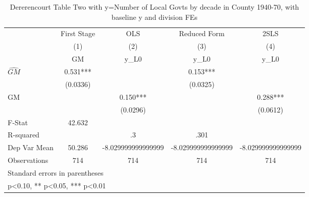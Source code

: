 \begin{table}[htbp]\centering
\def\sym#1{\ifmmode^{#1}\else\(^{#1}\)\fi}
\caption{Dererencourt Table Two with y=Number of Local Govts by decade in County 1940-70, with baseline y and division FEs}
\begin{tabular}{l*{4}{c}}
\toprule
                    & First Stage   &         OLS   &Reduced Form   &        2SLS   \\
                    &\multicolumn{1}{c}{(1)}&\multicolumn{1}{c}{(2)}&\multicolumn{1}{c}{(3)}&\multicolumn{1}{c}{(4)}\\
                    &\multicolumn{1}{c}{GM}&\multicolumn{1}{c}{y\_L0}&\multicolumn{1}{c}{y\_L0}&\multicolumn{1}{c}{y\_L0}\\
\midrule
$\hat{GM}$          &       0.531***&               &       0.153***&               \\
                    &    (0.0336)   &               &    (0.0325)   &               \\
\addlinespace
GM                  &               &       0.150***&               &       0.288***\\
                    &               &    (0.0296)   &               &    (0.0612)   \\
\midrule
F-Stat              &      42.632   &               &               &               \\
R-squared           &               &          .3   &        .301   &               \\
Dep Var Mean        &      50.286   &-8.029999999999999   &-8.029999999999999   &-8.029999999999999   \\
Observations        &         714   &         714   &         714   &         714   \\
\bottomrule
\multicolumn{5}{l}{\footnotesize Standard errors in parentheses}\\
\multicolumn{5}{l}{\footnotesize * p<0.10, ** p<0.05, *** p<0.01}\\
\end{tabular}
\end{table}
